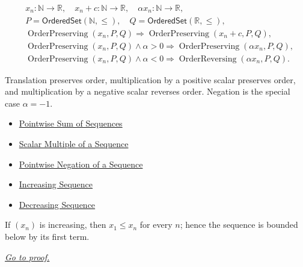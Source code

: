\begin{remark*}
\[
\begin{aligned}
&x_n\colon\mathbb{N}\to\mathbb{R},\quad
x_n+c\colon\mathbb{N}\to\mathbb{R},\quad
\alpha x_n\colon\mathbb{N}\to\mathbb{R},\\
&P=\mathsf{OrderedSet}(\mathbb{N},\leq),\quad
Q=\mathsf{OrderedSet}(\mathbb{R},\leq),\\
&\operatorname{OrderPreserving}(x_n,P,Q)
\Longrightarrow
\operatorname{OrderPreserving}(x_n+c,P,Q),\\
&\operatorname{OrderPreserving}(x_n,P,Q)\land\alpha>0
\Longrightarrow
\operatorname{OrderPreserving}(\alpha x_n,P,Q),\\
&\operatorname{OrderPreserving}(x_n,P,Q)\land\alpha<0
\Longrightarrow
\operatorname{OrderReversing}(\alpha x_n,P,Q).
\end{aligned}
\]
\end{remark*}

\begin{remark*}[Interpretation]
Translation preserves order, multiplication by a positive scalar preserves
order, and multiplication by a negative scalar reverses order. Negation is the
special case $\alpha=-1$.
\end{remark*}

\begin{dependencies}
\begin{itemize}
  \item \hyperref[def:pointwise-sum-sequence]{Pointwise Sum of Sequences}
  \item \hyperref[def:scalar-multiple-sequence]{Scalar Multiple of a Sequence}
  \item \hyperref[def:pointwise-negation-sequence]{Pointwise Negation of a Sequence}
  \item \hyperref[def:increasing-sequence]{Increasing Sequence}
  \item \hyperref[def:decreasing-sequence]{Decreasing Sequence}
\end{itemize}
\end{dependencies}

\begin{theorem}
\label{thm:increasing-bounded-below-by-first-term}
If $(x_n)$ is increasing, then $x_1\le x_n$ for every $n$; hence the sequence is bounded below by its first term.

\smallskip
\noindent
\hyperref[prf:increasing-bounded-below-by-first-term]{\textit{Go to proof.}}
\end{theorem}

